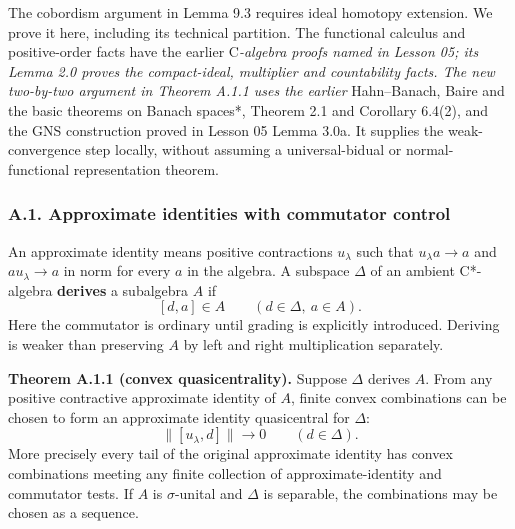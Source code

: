 \documentclass[
  11pt,
]{article}
\begin{document}
The cobordism argument in Lemma 9.3 requires ideal homotopy extension.
We prove it here, including its technical partition. The functional
calculus and positive-order facts have the earlier C\emph{-algebra
proofs named in Lesson 05; its Lemma 2.0 proves the compact-ideal,
multiplier and countability facts. The new two-by-two argument in
Theorem A.1.1 uses the earlier }Hahn--Banach, Baire and the basic
theorems on Banach spaces*, Theorem 2.1 and Corollary 6.4(2), and the
GNS construction proved in Lesson 05 Lemma 3.0a. It supplies the
weak-convergence step locally, without assuming a universal-bidual or
normal-functional representation theorem.

\subsubsection{A.1. Approximate identities with commutator
control}\label{a.1.-approximate-identities-with-commutator-control}

An approximate identity means positive contractions \(u_\lambda\) such
that \(u_\lambda a\to a\) and \(au_\lambda\to a\) in norm for every
\(a\) in the algebra. A subspace \(\Delta\) of an ambient C*-algebra
\textbf{derives} a subalgebra \(A\) if \[
[d,a]\in A\qquad(d\in\Delta,\ a\in A).
\tag{A.1.1}
\] Here the commutator is ordinary until grading is explicitly
introduced. Deriving is weaker than preserving \(A\) by left and right
multiplication separately.

\textbf{Theorem A.1.1 (convex quasicentrality).} Suppose \(\Delta\)
derives \(A\). From any positive contractive approximate identity of
\(A\), finite convex combinations can be chosen to form an approximate
identity quasicentral for \(\Delta\): \[
\|[u_\lambda,d]\|\longrightarrow0\qquad(d\in\Delta).
\tag{A.1.2}
\] More precisely every tail of the original approximate identity has
convex combinations meeting any finite collection of
approximate-identity and commutator tests. If \(A\) is \(\sigma\)-unital
and \(\Delta\) is separable, the combinations may be chosen as a
sequence.
\end{document}
